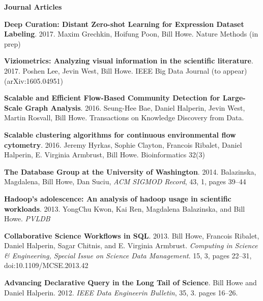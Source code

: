 {\bf Journal Articles}
\begin{bulletlist}

\item \textbf{Deep Curation: Distant Zero-shot Learning for Expression Dataset Labeling}. 2017.
Maxim Grechkin, Hoifung Poon, Bill Howe.
Nature Methods (in prep)

\item \textbf{Viziometrics: Analyzing visual information in the scientific literature}. 2017.
Poshen Lee, Jevin West, Bill Howe.
IEEE Big Data Journal (to appear) (arXiv:1605.04951)

\item \textbf{Scalable and Efficient Flow-Based Community Detection for Large-Scale Graph Analysis}. 2016.
Seung-Hee Bae, Daniel Halperin, Jevin West, Martin Rosvall, Bill Howe. 
Transactions on Knowledge Discovery from Data.

\item \textbf{Scalable clustering algorithms for continuous environmental flow cytometry}. 2016.
Jeremy Hyrkas, Sophie Clayton, Francois Ribalet, Daniel Halperin, E. Virginia Armbrust, Bill Howe. 
Bioinformatics 32(3)

\item \textbf{The Database Group at the University of Washington}. 2014.
Balazinska, Magdalena, Bill Howe, Dan Suciu,
\emph{ACM SIGMOD Record}, 43, 1, pages 39--44

\item \textbf{Hadoop's adolescence: An analysis of hadoop usage in scientific workloads}. 2013.
YongChu Kwon, Kai Ren, Magdalena Balazinska, and Bill Howe.
\emph{PVLDB}

\item \textbf{Collaborative Science Workflows in SQL}. 2013.
Bill Howe, Francois Ribalet, Daniel Halperin, Sagar Chitnis, and E. Virginia Armbrust.
\emph{Computing in Science \& Engineering,
Special Issue on Science Data Management}. 15, 3, pages 22--31, 
doi:10.1109/MCSE.2013.42


\item \textbf{Advancing Declarative Query in the Long Tail of Science}. 
Bill Howe and Daniel Halperin. 2012. 
\emph{IEEE Data Engineerin Bulletin},
35, 3. pages 16--26.


\end{bulletlist}
